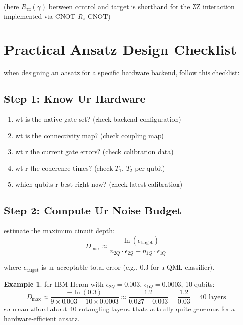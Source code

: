 \documentclass[11pt,a4paper]{article}
\theoremstyle{definition}
\newtheorem{example}{Example}[section]
\theoremstyle{remark}
\begin{document}
(here $R_{zz}(\gamma)$ between control and target is shorthand for the ZZ interaction implemented via CNOT-$R_z$-CNOT)

\section{Practical Ansatz Design Checklist}

when designing an ansatz for a specific hardware backend, follow this checklist:

\subsection{Step 1: Know Ur Hardware}

\begin{enumerate}[label=\arabic*.]
    \item wt is the native gate set? (check backend configuration)
    \item wt is the connectivity map? (check coupling map)
    \item wt r the current gate errors? (check calibration data)
    \item wt r the coherence times? (check $T_1$, $T_2$ per qubit)
    \item which qubits r best right now? (check latest calibration)
\end{enumerate}

\subsection{Step 2: Compute Ur Noise Budget}

estimate the maximum circuit depth:
\[
D_{\max} \approx \frac{-\ln(\epsilon_{\text{target}})}{n_{2Q} \cdot \epsilon_{2Q} + n_{1Q} \cdot \epsilon_{1Q}}
\]

where $\epsilon_{\text{target}}$ is ur acceptable total error (e.g., 0.3 for a QML classifier).

\begin{example}
for IBM Heron with $\epsilon_{2Q} = 0.003$, $\epsilon_{1Q} = 0.0003$, 10 qubits:
\[
D_{\max} \approx \frac{-\ln(0.3)}{9 \times 0.003 + 10 \times 0.0003} \approx \frac{1.2}{0.027 + 0.003} = \frac{1.2}{0.03} = 40 \text{ layers}
\]
so u can afford about 40 entangling layers. thats actually quite generous for a hardware-efficient ansatz.
\end{example}
\end{document}
